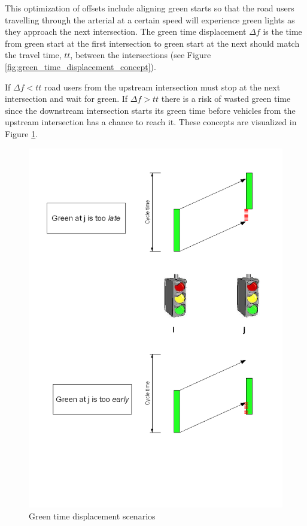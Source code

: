 This optimization of offsets include aligning green starts so that the road users travelling through the arterial at a certain speed will experience green lights as they approach the next intersection. The green time displacement $\Delta f$ is the time from green start at the first intersection to green start at the next should match the travel time, $tt$, between the intersections (see Figure \ref{fig:green_time_displacement_concept}). 

If $\Delta f < tt$ road users from the upstream intersection must stop at the next intersection and wait for green. If $\Delta f > tt$ there is a risk of wasted green time since the downstream intersection starts its green time before vehicles from the upstream intersection has a chance to reach it. These concepts are visualized in Figure \ref{fig:green_time_displacement}.

\begin{figure}[htb]
\centering
\includegraphics[scale=0.5]{green_time_displacement.png} 
\caption{Green time displacement scenarios}
\label{fig:green_time_displacement}
\end{figure}

